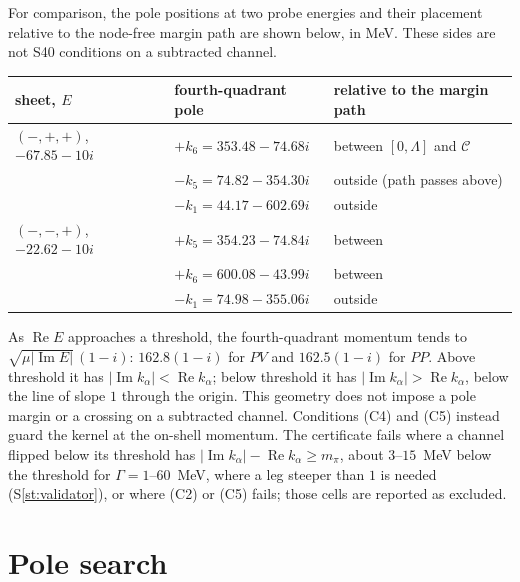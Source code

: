 \documentclass[11pt]{article}
\newcommand{\Sr}[1]{S\ref{#1}}
\begin{document}
For comparison, the pole positions at two probe energies and their placement relative to the node-free margin path are shown below, in MeV. These sides are not S40 conditions on a subtracted channel.
\begin{center}
\begin{tabular}{lll}
\toprule
sheet, $E$ & fourth-quadrant pole & relative to the margin path\\
\midrule
$(-,+,+)$, $-67.85-10i$ & $+k_6=353.48-74.68i$ & between $[0,\Lambda]$ and $\mathcal C$\\
 & $-k_5=74.82-354.30i$ & outside (path passes above)\\
 & $-k_1=44.17-602.69i$ & outside\\
$(-,-,+)$, $-22.62-10i$ & $+k_5=354.23-74.84i$ & between\\
 & $+k_6=600.08-43.99i$ & between\\
 & $-k_1=74.98-355.06i$ & outside\\
\bottomrule
\end{tabular}
\end{center}
As $\operatorname{Re}E$ approaches a threshold, the fourth-quadrant momentum tends to $\sqrt{\mu|\operatorname{Im}E|}\,(1-i)$: $162.8(1-i)$ for $PV$ and $162.5(1-i)$ for $PP$. Above threshold it has $|\operatorname{Im}k_\alpha|<\operatorname{Re}k_\alpha$; below threshold it has $|\operatorname{Im}k_\alpha|>\operatorname{Re}k_\alpha$, below the line of slope $1$ through the origin. This geometry does not impose a pole margin or a crossing on a subtracted channel. Conditions (C4) and (C5) instead guard the kernel at the on-shell momentum. The certificate fails where a channel flipped below its threshold has $|\operatorname{Im}k_\alpha|-\operatorname{Re}k_\alpha\ge m_\pi$, about $3$--$15$~MeV below the threshold for $\Gamma=1$--$60$~MeV, where a leg steeper than $1$ is needed (\Sr{st:validator}), or where (C2) or (C5) fails; those cells are reported as excluded.

\section{Pole search}\label{sec:poles}
\end{document}
